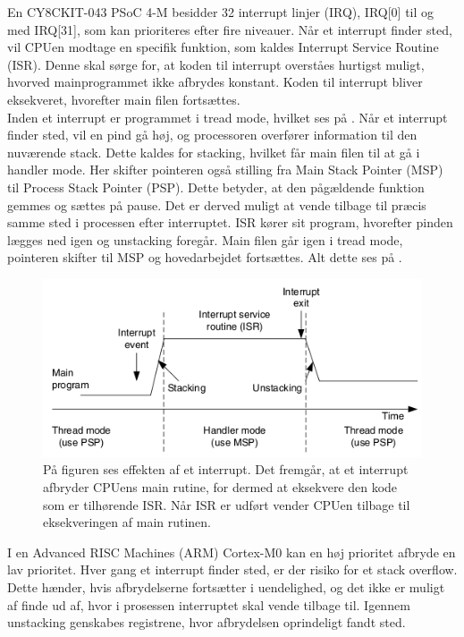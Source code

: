 En CY8CKIT-043 PSoC 4-M besidder 32 interrupt linjer (IRQ), IRQ[0] til og med IRQ[31], som kan prioriteres efter fire niveauer. %
Når et interrupt finder sted, vil CPUen modtage en specifik funktion, som kaldes Interrupt Service Routine (ISR). Denne skal sørge for, at koden til interrupt overståes hurtigst muligt, hvorved mainprogrammet ikke afbrydes konstant. Koden til interrupt bliver eksekveret, hvorefter main filen fortsættes. \citep{Badiger2016}\\
Inden et interrupt er programmet i tread mode, hvilket ses på . Når et interrupt finder sted, vil en pind gå høj, og processoren overfører information til den nuværende stack. Dette kaldes for stacking, hvilket får main filen til at gå i handler mode. Her skifter pointeren også stilling fra Main Stack Pointer (MSP) til Process Stack Pointer (PSP). Dette betyder, at den pågældende funktion gemmes og sættes på pause. Det er derved muligt at vende tilbage til præcis samme sted i processen efter interruptet. ISR kører sit program, hvorefter pinden lægges ned igen og unstacking foregår. Main filen går igen i tread mode, pointeren skifter til MSP og hovedarbejdet fortsættes. Alt dette ses på . \citep{Badiger2016,Tanenbaum2006}
\begin{figure}[H]
	\centering
	\includegraphics[scale=0.68]{figures/bProblemloesning/interrupt.png}
	\caption{På figuren ses effekten af et interrupt. Det fremgår, at et interrupt afbryder CPUens main rutine, for dermed at eksekvere den kode som er tilhørende ISR. Når ISR er udført vender CPUen tilbage til eksekveringen af main rutinen. \citep{Tanenbaum2006}}
	\label{fig:interrupt}
\end{figure}\vspace{-0.5cm}
I en Advanced RISC Machines (ARM) Cortex-M0 kan en høj prioritet afbryde en lav prioritet. Hver gang et interrupt finder sted, er der risiko for et stack overflow. Dette hænder, hvis afbrydelserne fortsætter i uendelighed, og det ikke er muligt af finde ud af, hvor i prosessen interruptet skal vende tilbage til. %
Igennem unstacking genskabes registrene, hvor afbrydelsen oprindeligt fandt sted. \citep{Badiger2016}

